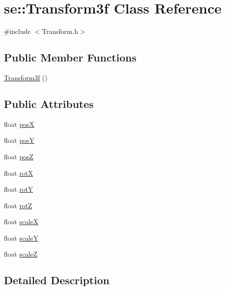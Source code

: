 \hypertarget{classse_1_1_transform3f}{}\section{se\+:\+:Transform3f Class Reference}
\label{classse_1_1_transform3f}


{\ttfamily \#include $<$Transform.\+h$>$}

\subsection*{Public Member Functions}
\begin{DoxyCompactItemize}
\item 
\mbox{\hyperlink{classse_1_1_transform3f_ad3b4895905ce0ca7e62fdf41044b7afb}{Transform3f}} ()
\end{DoxyCompactItemize}
\subsection*{Public Attributes}
\begin{DoxyCompactItemize}
\item 
float \mbox{\hyperlink{classse_1_1_transform3f_ad2c0078eef5e4b87361f764ad9ac4f84}{posX}}
\item 
float \mbox{\hyperlink{classse_1_1_transform3f_a3bc9b7dab3224ff12df803c157b86d3d}{posY}}
\item 
float \mbox{\hyperlink{classse_1_1_transform3f_a2429d1b09776ebf7737706bd7f57ab3c}{posZ}}
\item 
float \mbox{\hyperlink{classse_1_1_transform3f_a2ee9344ae3d32a543f40212dd8ee4a9c}{rotX}}
\item 
float \mbox{\hyperlink{classse_1_1_transform3f_a19689d88306a019419d31feeae7ea7b6}{rotY}}
\item 
float \mbox{\hyperlink{classse_1_1_transform3f_a454decdb9bcd426832064f69cfabcd93}{rotZ}}
\item 
float \mbox{\hyperlink{classse_1_1_transform3f_af87cb468268b871f516059ab9f84035f}{scaleX}}
\item 
float \mbox{\hyperlink{classse_1_1_transform3f_abc893c842f0fcbfe910b48b38e56a241}{scaleY}}
\item 
float \mbox{\hyperlink{classse_1_1_transform3f_af25deb0eb4f11f5f3e1f369a86bb3a91}{scaleZ}}
\end{DoxyCompactItemize}


\subsection{Detailed Description}


